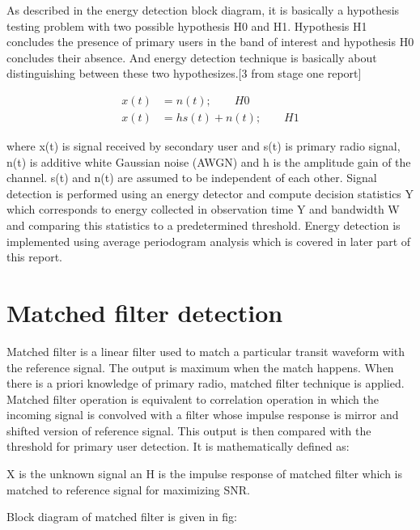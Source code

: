 As described in the energy detection block diagram, it is basically a hypothesis
testing problem with two possible hypothesis H0 and H1. Hypothesis H1 concludes 
the presence of primary users in the band of interest and hypothesis H0 
concludes their absence. And energy detection technique is basically about 
distinguishing between these two hypothesizes.[3 from stage one report]

\begin{align}
x(t) & = n(t); \qquad H0 \nonumber \\
x(t) & = hs(t)+n(t); \qquad H1 \nonumber
\end{align}

where x(t) is signal received by secondary user and s(t) is primary radio 
signal, n(t) is additive white Gaussian noise (AWGN) and h is the amplitude gain
of the channel.  s(t) and n(t) are assumed to be independent of each other. 
Signal detection is performed using an energy detector and compute decision 
statistics Y which corresponds to energy collected in observation time Y and 
bandwidth W and comparing this statistics to a predetermined threshold. Energy 
detection is implemented using average periodogram analysis which is covered in 
later part of this report.


\section{Matched filter detection}
Matched filter is a linear filter used to match a particular transit waveform 
with the reference signal. The output is maximum when the match happens. When 
there is a priori knowledge of primary radio, matched filter technique is 
applied. Matched filter operation is equivalent to correlation operation in 
which the incoming signal is convolved with a filter whose impulse response is 
mirror and shifted version of reference signal. This output is then compared 
with the threshold for primary user detection. It is mathematically defined as:



X is the unknown signal an H is the impulse response of matched filter which is 
matched to reference signal for maximizing SNR. 

Block diagram of matched filter is given in fig:

